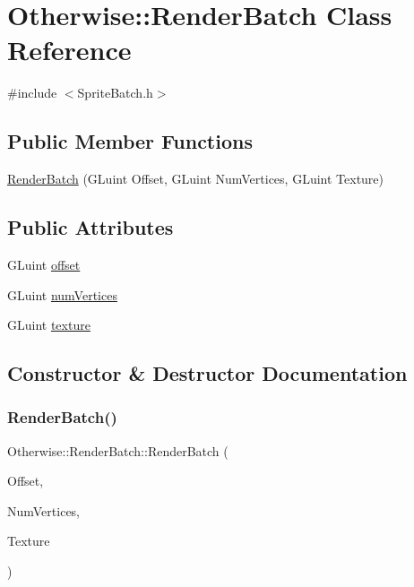 \hypertarget{class_otherwise_1_1_render_batch}{}\section{Otherwise\+:\+:Render\+Batch Class Reference}
\label{class_otherwise_1_1_render_batch}


{\ttfamily \#include $<$Sprite\+Batch.\+h$>$}

\subsection*{Public Member Functions}
\begin{DoxyCompactItemize}
\item 
\hyperlink{class_otherwise_1_1_render_batch_a6e88683b68fdde6c6ed110bbe54e4aa2}{Render\+Batch} (G\+Luint Offset, G\+Luint Num\+Vertices, G\+Luint Texture)
\end{DoxyCompactItemize}
\subsection*{Public Attributes}
\begin{DoxyCompactItemize}
\item 
G\+Luint \hyperlink{class_otherwise_1_1_render_batch_ac6001a3a6a1e9ec22bc938d01d9dbdef}{offset}
\item 
G\+Luint \hyperlink{class_otherwise_1_1_render_batch_abb003c70e26a0c30502ce5391d0dbd26}{num\+Vertices}
\item 
G\+Luint \hyperlink{class_otherwise_1_1_render_batch_adc06d7e472b774ef287462171ab9b6da}{texture}
\end{DoxyCompactItemize}


\subsection{Constructor \& Destructor Documentation}
\mbox{\label{class_otherwise_1_1_render_batch_a6e88683b68fdde6c6ed110bbe54e4aa2}} 
\subsubsection{\texorpdfstring{Render\+Batch()}{RenderBatch()}}
{\footnotesize\ttfamily Otherwise\+::\+Render\+Batch\+::\+Render\+Batch (\begin{DoxyParamCaption}\item[{G\+Luint}]{Offset,  }\item[{G\+Luint}]{Num\+Vertices,  }\item[{G\+Luint}]{Texture }\end{DoxyParamCaption})\hspace{0.3cm}{\ttfamily [inline]}}



